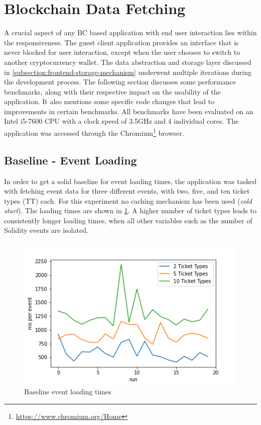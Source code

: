 \section{Blockchain Data Fetching}\label{section:data-model}

A crucial aspect of any BC based application with end user interaction lies within the responsiveness. The guest client application provides an interface that is never blocked for user interaction, except when the user chooses to switch to another cryptocurrency wallet. The data abstraction and storage layer discussed in \ref{subsection:frontend-storage-mechanism} underwent multiple iterations during the development process. The following section discusses some performance benchmarks, along with their respective impact on the usability of the application. It also mentions some specific code changes that lead to improvements in certain benchmarks. All benchmarks have been evaluated on an Intel i5-7600 CPU with a clock speed of 3.5GHz and 4 individual cores. The application was accessed through the Chromium\footnote{\href{https://www.chromium.org/Home}{https://www.chromium.org/Home}} browser.

\subsection{Baseline - Event Loading}\label{section:bl-events}
In order to get a solid baseline for event loading times, the application was tasked with fetching event data for three different events, with two, five, and ten ticket types (TT) each. For this experiment no caching mechanism has been used (\textit{cold start}). The loading times are shown in \ref{img:baseline1}. A higher number of ticket types leads to consistently longer loading times, when all other variables such as the number of Solidity events are isolated.

\begin{figure}[H]
    \centering
    \includegraphics[width=14cm]{images/plot1.png}
    \caption{Baseline event loading times}
    \label{img:baseline1}
\end{figure}

